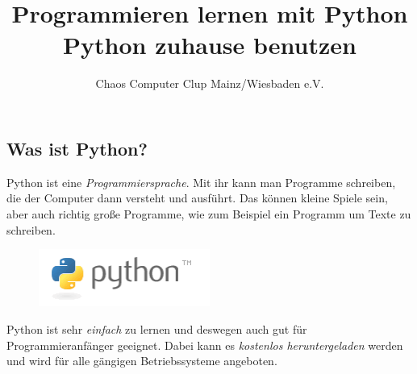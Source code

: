 



	\title{Programmieren lernen mit Python\\Python zuhause benutzen}
	\author{Chaos Computer Clup Mainz/Wiesbaden e.V.}
	\maketitle
	
	\subsection*{Was ist Python?}
	Python ist eine \emph{Programmiersprache}. Mit ihr kann man Programme schreiben, die der Computer dann versteht und ausführt. Das können kleine Spiele sein, aber auch richtig große Programme, wie zum Beispiel ein Programm um Texte zu schreiben.
	
	\begin{figure}[htbp]
		\centering
		\includegraphics[width=0.5\textwidth]{img/python-logo.png}
	\end{figure}
	
	Python ist sehr \emph{einfach} zu lernen und deswegen auch gut für Programmieranfänger geeignet. Dabei kann es \emph{kostenlos heruntergeladen} werden und wird für alle gängigen Betriebssysteme angeboten.
	
